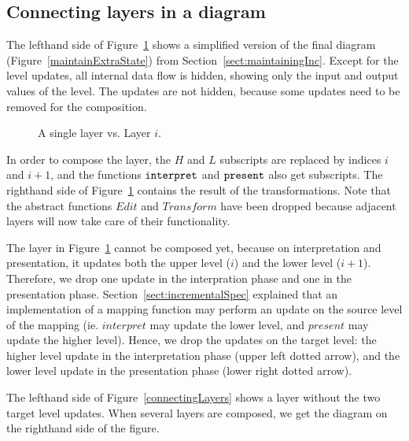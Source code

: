 \subsection{Connecting layers in a diagram}

The lefthand side of Figure~\ref{singleToMulti} shows a simplified version of the final diagram (Figure~\ref{maintainExtraState}) from Section~\ref{sect:maintainingInc}. Except for the level updates, all internal data flow is hidden, showing only the input and output values of the level. The updates are not hidden, because some updates need to be removed for the composition.

\begin{figure}\begin{small}\begin{center}\begin{center}
\end{center}
\caption{A single layer vs. Layer $i$.}\label{singleToMulti} 
\end{center}\end{small}\end{figure}

In order to compose the layer, the $H$ and $L$ subscripts are replaced by indices $i$ and $i+1$, and the functions ${\tt interpret}$ and ${\tt present}$ also get subscripts. The righthand side of Figure~\ref{singleToMulti} contains the result of the transformations. Note that the abstract functions $Edit$ and $Transform$ have been dropped because adjacent layers will now take care of their functionality.

The layer in Figure~\ref{singleToMulti} cannot be composed yet, because on interpretation and presentation, it updates both the upper level ($i$) and the lower level ($i+1$). Therefore, we drop one update in the interpration phase and one in the presentation phase. Section~\ref{sect:incrementalSpec} explained that an implementation of a mapping function may perform an update on the source level of the mapping (ie. $interpret$ may update the lower level, and $present$ may update the higher level). Hence, we drop the updates on the target level: the higher level update in the interpretation phase (upper left dotted arrow), and the lower level update in the presentation phase (lower right dotted arrow). 

The lefthand side of Figure~\ref{connectingLayers} shows a layer without the two target level updates. When several layers are composed, we get the diagram on the righthand side of the figure.

